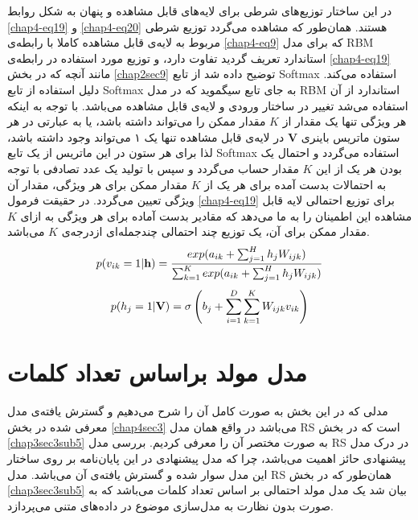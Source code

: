 در این ساختار توزیع‌های شرطی برای لایه‌های قابل مشاهده و پنهان به شکل روابط
\ref{chap4-eq19}
و
\ref{chap4-eq20}
هستند. همان‌طور که مشاهده می‌‌گردد توزیع شرطی مربوط به لایه‌ی قابل مشاهده کاملا با رابطه‌ی
\ref{chap4-eq9}
که برای مدل
RBM
استاندارد تعریف گردید تفاوت دارد، و توزیع مورد استفاده در رابطه‌ی
\ref{chap4-eq19}
 مانند آنچه که در بخش
\ref{chap2sec9}
توضیح داده شد از تابع
Softmax
استفاده می‌‌کند. دلیل استفاده از تابع
Softmax
به جای تابع سیگموید که در مدل
RBM
استاندارد از آن استفاده می‌‌شد تغییر در ساختار ورودی و لایه‌ی قابل مشاهده می‌‌باشد. با توجه به اینکه هر ویژگی‌ تنها یک مقدار از
$K$
مقدار ممکن را می‌‌تواند داشته باشد، یا به عبارتی در هر ستون ماتریس باینری
$\textbf{V}$
 در لایه‌ی قابل مشاهده تنها یک ۱ می‌‌تواند وجود داشته باشد، لذا برای هر ستون در این ماتریس از یک تابع
Softmax
استفاده می‌گردد و احتمال یک بودن هر یک از این
$K$
 مقدار حساب می‌گردد و سپس با تولید یک عدد تصادفی با توجه به احتمالات بدست آمده برای هر یک از
$K$
مقدار ممکن برای هر ویژگی‌، مقدار آن ویژگی‌ تعیین می‌‌گردد. در حقیقت فرمول
\ref{chap4-eq19}
برای توزیع احتمالی‌ لایه قابل مشاهده این اطمینان را به ما می‌دهد که مقادیر بدست آماده برای هر ویژگی‌ به ازای
$K$
مقدار ممکن برای آن، یک توزیع چند احتمالی‌ چندجمله‌ای ازدرجه‌ی
$K$
می‌باشد.
\begin{align}
	\centering
	\label{chap4-eq19}
	p(v_{ik}=1|\textbf{h})=\dfrac{exp(a_{ik}+\sum_{j=1}^{H}h_jW_{ijk})}{\sum_{k=1}^{K}exp(a_{ik}+\sum_{j=1}^{H}h_jW_{ijk})}
\end{align}
\begin{align}
	\centering
	\label{chap4-eq20}
	p(h_{j}=1|\textbf{V})=\sigma \left( b_j +  \sum_{i=1}^{D}\sum_{k=1}^{K}W_{ijk}v_{ik} \right)
\end{align}

\section{مدل مولد براساس تعداد کلمات}
\label{chap4sec4}

مدلی‌ که در این بخش به صورت کامل آن را شرح می‌‌دهیم و گسترش یافته‌ی مدل معرفی‌ شده در بخش
\ref{chap4sec3}
می‌باشد در واقع همان مدل
RS
 است که در بخش
\ref{chap3sec3sub5}
به صورت مختصر آن را معرفی‌ کردیم. بررسی‌ مدل
RS
در درک مدل پیشنهادی حائز اهمیت می‌‌باشد، چرا که مدل پیشنهادی در این پایان‌‌نامه بر روی ساختار این مدل سوار شده و گسترش یافته‌ی آن می‌‌باشد. مدل
RS
 همان‌طور که در بخش
\ref{chap3sec3sub5}
بیان شد یک مدل مولد احتمالی‌ بر اساس تعداد کلمات می‌‌باشد که به صورت بدون نظارت به مدل‌سازی موضوع در داده‌های متنی می‌‌پردازد.

